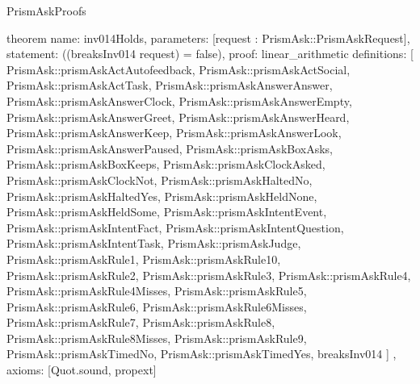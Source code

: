 \begin{lexlean}{PrismAskProofs}
\begin{semanticmodule}
theorem{
  name: inv014Holds,
  parameters: [request : PrismAsk::PrismAskRequest],
  statement: ((breaksInv014 request) = false),
  proof: linear_arithmetic{
    definitions: [
      PrismAsk::prismAskActAutofeedback,
      PrismAsk::prismAskActSocial,
      PrismAsk::prismAskActTask,
      PrismAsk::prismAskAnswerAnswer,
      PrismAsk::prismAskAnswerClock,
      PrismAsk::prismAskAnswerEmpty,
      PrismAsk::prismAskAnswerGreet,
      PrismAsk::prismAskAnswerHeard,
      PrismAsk::prismAskAnswerKeep,
      PrismAsk::prismAskAnswerLook,
      PrismAsk::prismAskAnswerPaused,
      PrismAsk::prismAskBoxAsks,
      PrismAsk::prismAskBoxKeeps,
      PrismAsk::prismAskClockAsked,
      PrismAsk::prismAskClockNot,
      PrismAsk::prismAskHaltedNo,
      PrismAsk::prismAskHaltedYes,
      PrismAsk::prismAskHeldNone,
      PrismAsk::prismAskHeldSome,
      PrismAsk::prismAskIntentEvent,
      PrismAsk::prismAskIntentFact,
      PrismAsk::prismAskIntentQuestion,
      PrismAsk::prismAskIntentTask,
      PrismAsk::prismAskJudge,
      PrismAsk::prismAskRule1,
      PrismAsk::prismAskRule10,
      PrismAsk::prismAskRule2,
      PrismAsk::prismAskRule3,
      PrismAsk::prismAskRule4,
      PrismAsk::prismAskRule4Misses,
      PrismAsk::prismAskRule5,
      PrismAsk::prismAskRule6,
      PrismAsk::prismAskRule6Misses,
      PrismAsk::prismAskRule7,
      PrismAsk::prismAskRule8,
      PrismAsk::prismAskRule8Misses,
      PrismAsk::prismAskRule9,
      PrismAsk::prismAskTimedNo,
      PrismAsk::prismAskTimedYes,
      breaksInv014
    ]
  },
  axioms: [Quot.sound, propext]
}
\end{semanticmodule}
\end{lexlean}

